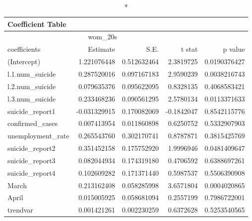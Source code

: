 \begin{longtable}{lrrrr}
\caption*{
{\large Coefficient Table}
} \\ 
\toprule
\multicolumn{4}{c}{wom\_20s} &  \\ 
\cmidrule(lr){1-4}
coefficients & Estimate & S.E. & t stat & p value \\ 
\midrule\addlinespace[2.5pt]
(Intercept) & 1.221076448 & 0.512632464 & 2.3819725 & 0.0190376427 \\ 
l.1.num\_suicide & 0.287520016 & 0.097167183 & 2.9590239 & 0.0038216743 \\ 
l.2.num\_suicide & 0.079635376 & 0.095622095 & 0.8328135 & 0.4068583421 \\ 
l.3.num\_suicide & 0.233468236 & 0.090561295 & 2.5780134 & 0.0113371633 \\ 
suicide\_report1 & -0.031329915 & 0.170082069 & -0.1842047 & 0.8542115776 \\ 
confirmed\_cases & 0.007413954 & 0.011860898 & 0.6250752 & 0.5332907903 \\ 
unemployment\_rate & 0.265543760 & 0.302170741 & 0.8787871 & 0.3815425769 \\ 
suicide\_report2 & 0.351452158 & 0.175752920 & 1.9996946 & 0.0481409647 \\ 
suicide\_report3 & 0.082044934 & 0.174319180 & 0.4706592 & 0.6388697261 \\ 
suicide\_report4 & 0.102609282 & 0.171371440 & 0.5987537 & 0.5506390908 \\ 
March & 0.213162408 & 0.058285998 & 3.6571804 & 0.0004020865 \\ 
April & 0.015005925 & 0.058681094 & 0.2557199 & 0.7986722001 \\ 
trendvar & 0.001421261 & 0.002230259 & 0.6372628 & 0.5253540565 \\ 
\bottomrule
\end{longtable}

